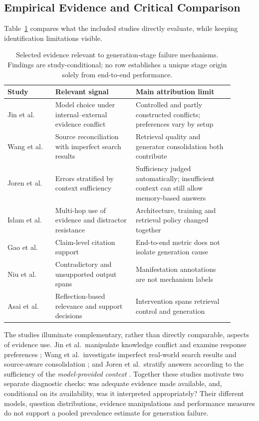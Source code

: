\subsection{Empirical Evidence and Critical Comparison}
\label{subsec:s9-comparison}

Table~\ref{tab:s9-evidence} compares what the included studies directly evaluate, while keeping identification limitations visible.

\begin{table}[t]
\centering
\caption{Selected evidence relevant to generation-stage failure mechanisms. Findings are study-conditional; no row establishes a unique stage origin solely from end-to-end performance.}
\label{tab:s9-evidence}
\small
\begin{tabular}{@{}p{0.19\linewidth}p{0.32\linewidth}p{0.39\linewidth}@{}}
\toprule
Study & Relevant signal & Main attribution limit \\
\midrule
Jin et al.\ \cite{jin2024tug} & Model choice under internal--external evidence conflict & Controlled and partly constructed conflicts; preferences vary by setup \\
Wang et al.\ \cite{wang2025astute} & Source reconciliation with imperfect search results & Retrieval quality and generator consolidation both contribute \\
Joren et al.\ \cite{joren2025sufficient} & Errors stratified by context sufficiency & Sufficiency judged automatically; insufficient context can still allow memory-based answers \\
Islam et al.\ \cite{islam2024openrag} & Multi-hop use of evidence and distractor resistance & Architecture, training and retrieval policy changed together \\
Gao et al.\ \cite{gao2023alce} & Claim-level citation support & End-to-end metric does not isolate generation cause \\
Niu et al.\ \cite{niu2024ragtruth} & Contradictory and unsupported output spans & Manifestation annotations are not mechanism labels \\
Asai et al.\ \cite{asai2024selfrag} & Reflection-based relevance and support decisions & Intervention spans retrieval control and generation \\
\bottomrule
\end{tabular}
\end{table}

The studies illuminate complementary, rather than directly comparable, aspects of evidence use. Jin et al.\ manipulate knowledge conflict and examine response preferences \cite{jin2024tug}; Wang et al.\ investigate imperfect real-world search results and source-aware consolidation \cite{wang2025astute}; and Joren et al.\ stratify answers according to the sufficiency of the \emph{model-provided context} \cite{joren2025sufficient}. Together these studies motivate two separate diagnostic checks: was adequate evidence made available, and, conditional on its availability, was it interpreted appropriately? Their different models, question distributions, evidence manipulations and performance measures do not support a pooled prevalence estimate for generation failure.

